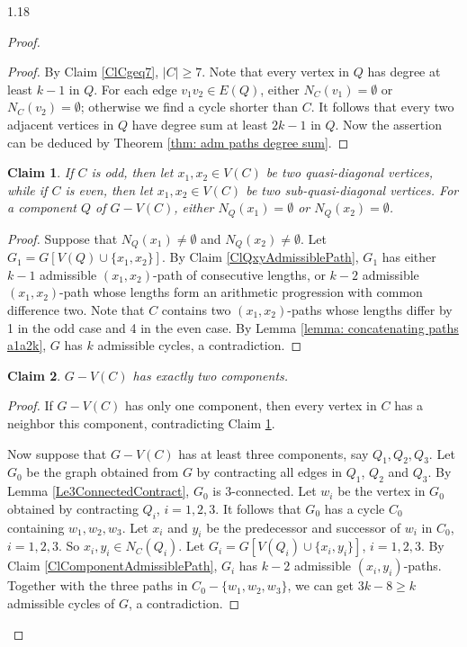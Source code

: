 \documentclass[10pt]{article}
\newtheorem{claim}{Claim}
\begin{document}
\begin{spacing}{1.18}
\begin{proof}
\begin{proof}
    By Claim \ref{ClCgeq7}, $|C|\geqslant 7$. Note that every vertex in $Q$ has degree at least $k-1$ in $Q$. For each edge $v_1v_2\in E(Q)$, either $N_C(v_1)=\emptyset$ or $N_C(v_2)=\emptyset$; otherwise we find a cycle shorter than $C$. It follows that every two adjacent vertices in $Q$ have degree sum at least $2k-1$ in $Q$. Now the assertion can be deduced by Theorem \ref{thm: adm paths degree sum}.
\end{proof}

\begin{claim}\label{ClSemiQuasiNQ}
    If $C$ is odd, then let $x_1,x_2\in V(C)$ be two quasi-diagonal vertices, while if $C$ is even, then let $x_1,x_2\in V(C)$ be two sub-quasi-diagonal vertices. For a component $Q$ of $G-V(C)$, either $N_Q(x_1)=\emptyset$ or $N_Q(x_2)=\emptyset$.
\end{claim}

\begin{proof}
    Suppose that $N_Q(x_1)\neq\emptyset$ and $N_Q(x_2)\neq\emptyset$. Let $G_1=G[V(Q)\cup\{x_1,x_2\}]$. By Claim \ref{ClQxyAdmissiblePath}, $G_1$ has either $k-1$ admissible $(x_1,x_2)$-path of consecutive lengths, or $k-2$ admissible $(x_1,x_2)$-path whose lengths form an arithmetic progression with common difference two. Note that $C$ contains two $(x_1,x_2)$-paths whose lengths differ by 1 in the odd case and 4 in the even case. By Lemma \ref{lemma: concatenating paths a1a2k}, $G$ has $k$ admissible cycles, a contradiction.   
\end{proof}

\begin{claim}\label{ClExactlyTwoComponent}
    $G-V(C)$ has exactly two components.
\end{claim}

\begin{proof}
    If $G-V(C)$ has only one component, then every vertex in $C$ has a neighbor this component, contradicting Claim \ref{ClSemiQuasiNQ}.

    Now suppose that $G-V(C)$ has at least three components, say $Q_1,Q_2,Q_3$. Let $G_0$ be the graph obtained from $G$ by contracting all edges in $Q_1$, $Q_2$ and $Q_3$. By Lemma \ref{Le3ConnectedContract}, $G_0$ is 3-connected. Let $w_i$ be the vertex in $G_0$ obtained by contracting $Q_i$, $i=1,2,3$. It follows that $G_0$ has a cycle $C_0$ containing $w_1,w_2,w_3$. Let $x_i$ and $y_i$ be the predecessor and successor of $w_i$ in $C_0$, $i=1,2,3$. So $x_i,y_i\in N_C(Q_i)$. Let $G_i=G[V(Q_i)\cup\{x_i,y_i\}]$, $i=1,2,3$. By Claim \ref{ClComponentAdmissiblePath}, $G_i$ has $k-2$ admissible $(x_i,y_i)$-paths. Together with the three paths in $C_0-\{w_1,w_2,w_3\}$, we can get $3k-8\geqslant k$ admissible cycles of $G$, a contradiction. 
\end{proof}


\end{proof}
\end{spacing}
\end{document}
